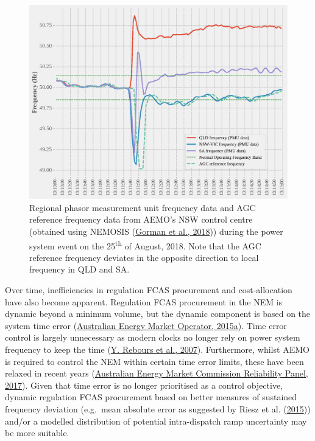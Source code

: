 \documentclass[12pt,a4paper,]{report}
\begin{document}
\begin{figure}
\hypertarget{fig:regional_freq}{%
\centering
\includegraphics{source/figures/regional_SCADA_frequencies.eps}
\caption[System frequency (as registered by phasor measurement units and
AEMO\textquotesingle s AGC) during the power system event on the
25\^{}th\^{} of August, 2018]{Regional phasor measurement unit frequency
data and AGC reference frequency data from AEMO's NSW control centre
(obtained using NEMOSIS
(\protect\hyperlink{ref-gormanNEMOSISNEMOpen2018}{Gorman et al., 2018}))
during the power system event on the 25\textsuperscript{th} of August,
2018. Note that the AGC reference frequency deviates in the opposite
direction to local frequency in QLD and SA.}\label{fig:regional_freq}
}
\end{figure}

Over time, inefficiencies in regulation FCAS procurement and
cost-allocation have also become apparent. Regulation FCAS procurement
in the NEM is dynamic beyond a minimum volume, but the dynamic component
is based on the system time error
(\protect\hyperlink{ref-australianenergymarketoperatorConstraintImplementationGuidelines2015}{Australian
Energy Market Operator, 2015a}). Time error control is largely
unnecessary as modern clocks no longer rely on power system frequency to
keep the time
(\protect\hyperlink{ref-reboursFundamentalDesignIssues2007}{Y. Rebours
et al., 2007}). Furthermore, whilst AEMO is required to control the NEM
within certain time error limits, these have been relaxed in recent
years
(\protect\hyperlink{ref-australianenergymarketcommissionreliabilitypanelStageOneFinal2017}{Australian
Energy Market Commission Reliability Panel, 2017}). Given that time
error is no longer prioritised as a control objective, dynamic
regulation FCAS procurement based on better measures of sustained
frequency deviation (e.g.~mean absolute error as suggested by Riesz et
al. (\protect\hyperlink{ref-rieszFrequencyControlAncillary2015}{2015}))
and/or a modelled distribution of potential intra-dispatch ramp
uncertainty may be more suitable.
\end{document}
